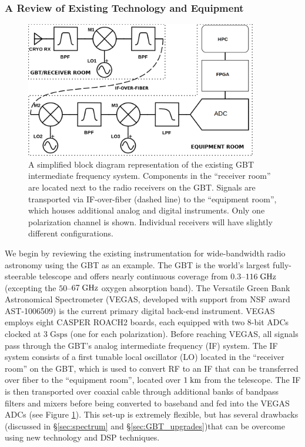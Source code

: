 \documentclass[10pt]{myNSF}
\begin{document}
\subsubsection{A Review of Existing Technology and Equipment}
\label{sec:review}

\begin{figure}
  \centering \includegraphics[width=0.9\textwidth]{if_diagram.png}
  \caption{A simplified block diagram representation of the existing
    GBT intermediate frequency system.  Components in the ``receiver
    room'' are located next to the radio receivers on the GBT.
    Signals are transported via IF-over-fiber (dashed line) to the
    ``equipment room'', which houses additional analog and digital
    instruments. Only one polarization channel is shown.  Individual
    receivers will have slightly different
    configurations. \label{fig:gbt_if}}
\end{figure}
  
We begin by reviewing the existing instrumentation for wide-bandwidth
radio astronomy using the GBT as an example.  The GBT is the world's
largest fully-steerable telescope and offers nearly continuous
coverage from $0.3$--$116\; \textrm{GHz}$ (excepting the $50$--$67\; \textrm{GHz}$
oxygen absorption band).  The Versatile Green Bank Astronomical
Spectrometer (VEGAS, developed with support from NSF award
AST-1006509) is the current primary digital back-end instrument.
VEGAS employs eight CASPER ROACH2 boards, each equipped with two 8-bit
ADCs clocked at $3\; \mathrm{Gsps}$ (one for each polarization).
Before reaching VEGAS, all signals pass through the GBT's analog
intermediate frequency (IF) system.  The IF system consists of a first
tunable local oscillator (LO) located in the ``receiver room'' on the
GBT, which is used to convert RF to an IF that can be transferred over
fiber to the ``equipment room'', located over $1\; \textrm{km}$ from the
telescope.  The IF is then transported over coaxial cable through
additional banks of bandpass filters and mixers before being converted
to baseband and fed into the VEGAS ADCs (see Figure \ref{fig:gbt_if}).
This set-up is extremely flexible, but has several drawbacks
(discussed in \S\ref{sec:spectrum} and \S\ref{sec:GBT_upgrades})that
can be overcome using new technology and DSP techniques.
\end{document}
